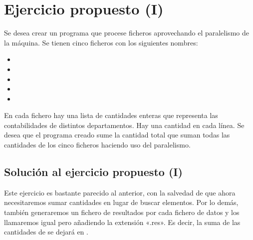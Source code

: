 \documentclass[letterpaper,10pt,spanish]{sphinxmanual}
\begin{document}
\begin{sphinxVerbatim}[commandchars=\\\{\}]
                                \PYG{o}{[}\PYG{o}{]} \PYG{o}{[}\PYG{o}{]}  
         
\end{sphinxVerbatim}


\section{Ejercicio propuesto (I)}
\label{\detokenize{textos/tema1:ejercicio-propuesto-i}}
Se desea crear un programa que procese ficheros aprovechando el paralelismo de la máquina. Se tienen cinco ficheros con los siguientes nombres:
\begin{itemize}
\item {} 

\item {} 

\item {} 

\item {} 

\item {} 

\end{itemize}

En cada fichero hay una lista de cantidades enteras que representa las contabilidades de distintos departamentos. Hay una cantidad en cada línea. Se desea que el programa creado sume la cantidad total que suman todas las cantidades de los cinco ficheros haciendo uso del paralelismo.


\subsection{Solución al ejercicio propuesto (I)}
\label{\detokenize{textos/tema1:solucion-al-ejercicio-propuesto-i}}
Este ejercicio es bastante parecido al anterior, con la salvedad de que ahora necesitaremos sumar cantidades en lugar de buscar elementos. Por lo demás,  también generaremos un fichero de resultados por cada fichero de datos y los llamaremos igual pero añadiendo la extensión «.res». Es decir, la suma de las cantidades de  se dejará en .
\end{document}
